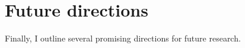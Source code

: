 

\section{Future directions}
\label{sec:17-futurework}


Finally, I outline several promising directions for future research.

